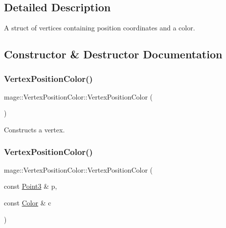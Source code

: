 \subsection{Detailed Description}
A struct of vertices containing position coordinates and a color. 

\subsection{Constructor \& Destructor Documentation}
\hypertarget{structmage_1_1_vertex_position_color_a9346fd83bc634a105b3d81231c42136b}{}\label{structmage_1_1_vertex_position_color_a9346fd83bc634a105b3d81231c42136b} 
\subsubsection{\texorpdfstring{Vertex\+Position\+Color()}{VertexPositionColor()}\hspace{0.1cm}{\footnotesize\ttfamily [1/4]}}
{\footnotesize\ttfamily mage\+::\+Vertex\+Position\+Color\+::\+Vertex\+Position\+Color (\begin{DoxyParamCaption}{ }\end{DoxyParamCaption})\hspace{0.3cm}{\ttfamily [default]}}

Constructs a vertex. \hypertarget{structmage_1_1_vertex_position_color_aa41e2d55816bf687261f91f8e79846f2}{}\label{structmage_1_1_vertex_position_color_aa41e2d55816bf687261f91f8e79846f2} 
\subsubsection{\texorpdfstring{Vertex\+Position\+Color()}{VertexPositionColor()}\hspace{0.1cm}{\footnotesize\ttfamily [2/4]}}
{\footnotesize\ttfamily mage\+::\+Vertex\+Position\+Color\+::\+Vertex\+Position\+Color (\begin{DoxyParamCaption}\item[{const \hyperlink{structmage_1_1_point3}{Point3} \&}]{p,  }\item[{const \hyperlink{structmage_1_1_color}{Color} \&}]{c }\end{DoxyParamCaption})\hspace{0.3cm}{\ttfamily [explicit]}}

